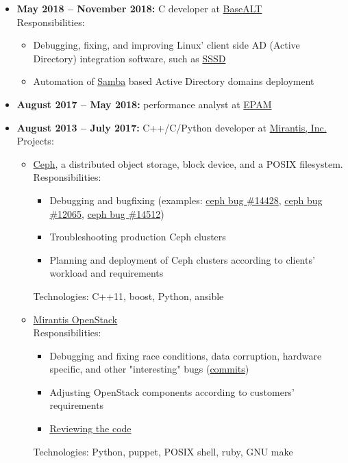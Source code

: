 \documentclass{report}
\begin{document}
\begin{itemize}
\item
  {\bf May 2018 -- November 2018:} C developer at \href{http://www.basealt.ru}{BaseALT}\\
  Responsibilities:
  \begin{itemize}
  \item Debugging, fixing, and improving Linux' client side AD (Active Directory)
        integration software, such as \href{https://pagure.io/SSSD}{SSSD}
  \item Automation of \href{http://www.samba.org}{Samba} based Active Directory
	domains deployment
  \end{itemize}
\item
  {\bf August 2017 -- May 2018:} performance analyst at \href{http://epam.com}{EPAM} \\
\item 
  {\bf August 2013 -- July 2017:} C++/C/Python developer at \href{https://www.mirantis.com}{Mirantis, Inc.} \\
 Projects:
 \begin{itemize}
   \item \href{http://ceph.com}{Ceph}, a distributed object storage, block device,
     and a POSIX filesystem. \\
     Responsibilities:
     \begin{itemize}
       \item Debugging and bugfixing (examples:
	  \href{https://github.com/ceph/ceph/commit/aba6746b850e9397ff25570f08d0af8847a7162c}{ceph bug \#14428},
	  \href{https://github.com/ceph/ceph/commit/918c12c2ab5d014d0623b1accf959b041aac5128}{ceph bug \#12065},
	  \href{https://github.com/ceph/ceph/commit/aab3a40f95dafab34a7eadc2159d142a5f0f88f1}{ceph bug \#14512})
       \item Troubleshooting production Ceph clusters
       \item Planning and deployment of Ceph clusters according to clients' workload and requirements
     \end{itemize}
     Technologies: C++11, boost, Python, ansible

   \item
   \href{https://www.mirantis.com/software/mirantis-openstack-software}{Mirantis OpenStack} \\
  Responsibilities:
  \begin{itemize}
     \item
       Debugging and fixing race conditions, data corruption, hardware specific,
       and other "interesting" bugs
       (\href{http://stackalytics.com/?release=all&company=mirantis&user_id=asheplyakov&metric=commits}{commits})
     \item
       Adjusting OpenStack components according to customers' requirements
     \item
       \href{http://stackalytics.com/?release=all&company=mirantis&user_id=asheplyakov&metric=marks}{Reviewing the code}
  \end{itemize}
  Technologies: Python, puppet, POSIX shell, ruby, GNU make
  \end{itemize}


\end{itemize}
\end{document}
